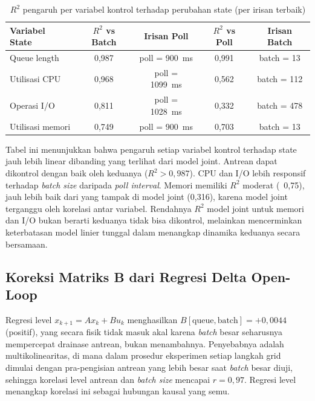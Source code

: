\begin{table}[H]
    \centering
    \caption{$R^2$ pengaruh per variabel kontrol terhadap perubahan state (per irisan terbaik)}
    \label{tab:sysid-fit-partial}
    \renewcommand{\arraystretch}{1.4}
    \begin{tabular}{|l|c|c|c|c|}
    \hline
    \textbf{Variabel State} & \textbf{$R^2$ vs Batch} & \textbf{Irisan Poll} & \textbf{$R^2$ vs Poll} & \textbf{Irisan Batch} \\
    \hline
    Queue length   & 0,987 & poll = 900~ms  & 0,991 & batch = 13 \\
    \hline
    Utilisasi CPU  & 0,968 & poll = 1099~ms & 0,562 & batch = 112 \\
    \hline
    Operasi I/O    & 0,811 & poll = 1028~ms & 0,332 & batch = 478 \\
    \hline
    Utilisasi memori & 0,749 & poll = 900~ms & 0,703 & batch = 13 \\
    \hline
    \end{tabular}
\end{table}

Tabel ini menunjukkan bahwa pengaruh setiap variabel kontrol terhadap state jauh lebih linear
dibanding yang terlihat dari model joint.
Antrean dapat dikontrol dengan baik oleh keduanya ($R^2 > 0{,}987$).
CPU dan I/O lebih responsif terhadap \emph{batch size} daripada \emph{poll interval}.
Memori memiliki $R^2$ moderat (~0{,}75), jauh lebih baik dari yang tampak di model joint (0{,}316),
karena model joint terganggu oleh korelasi antar variabel.
Rendahnya $R^2$ model joint untuk memori dan I/O bukan berarti keduanya tidak bisa dikontrol,
melainkan mencerminkan keterbatasan model linier tunggal dalam menangkap dinamika keduanya
secara bersamaan.

\subsection{Koreksi Matriks B dari Regresi Delta Open-Loop}

Regresi level $x_{k+1} = Ax_k + Bu_k$ menghasilkan $B[\text{queue}, \text{batch}] = +0{,}0044$
(positif), yang secara fisik tidak masuk akal karena \emph{batch} besar seharusnya mempercepat
drainase antrean, bukan menambahnya.
Penyebabnya adalah multikolinearitas, di mana dalam prosedur eksperimen setiap langkah grid dimulai
dengan pra-pengisian antrean yang lebih besar saat \emph{batch} besar diuji, sehingga korelasi
level antrean dan \emph{batch size} mencapai $r = 0{,}97$.
Regresi level menangkap korelasi ini sebagai hubungan kausal yang semu.

